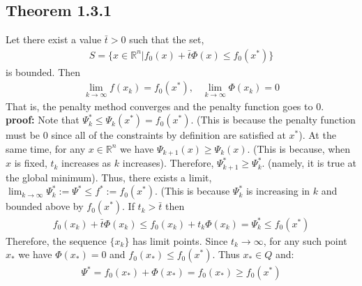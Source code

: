 \documentclass[12pt,a4paper]{article}
\begin{document}
	\subsection*{Theorem 1.3.1}\label{thm131}
	Let there exist a value $\bar{t}>0$ such that the set,
	\begin{align*}
		S = \{x \in \mathbb{R}^n | f_0(x) + \bar{t}\Phi(x) \leq f_0(x^*)\}
	\end{align*}
	is bounded. Then
	\begin{align*}
		\lim_{k \rightarrow \infty}f(x_k) = f_0(x^*), \hspace{10pt} \lim_{k \rightarrow \infty}\Phi(x_k) = 0
	\end{align*}
	That is, the penalty method converges and the penalty function goes to $0$.\\
	\textbf{proof:} Note that $\Psi_k^* \leq \Psi_k(x^*) = f_0(x^*)$. (This is because the penalty function must be $0$ since all of the constraints by definition are satisfied at $x^*$). At the same time, for any $x \in \mathbb{R}^n$ we have $\Psi_{k+1}(x)\geq \Psi_k(x)$. (This is because, when $x$ is fixed, $t_k$ increases as $k$ increases). Therefore, $\Psi_{k+1}^* \geq  \Psi_k^*$. (namely, it is true at the global minimum). Thus, there exists a limit, $\lim_{k \rightarrow \infty}\Psi_k^* := \Psi^* \leq f^* := f_0(x^*)$. (This is because $\Psi_k^*$ is increasing in $k$ and bounded above by $f_0(x^*)$. If $t_k > \bar{t}$ then
	\begin{align*}
		f_0(x_k) + \bar{t}\Phi(x_k) \leq f_0(x_k) + t_k\Phi(x_k) = \Psi_k^* \leq f_0(x^*)
	\end{align*}
	Therefore, the sequence $\{x_k\}$ has limit points. Since $t_k \rightarrow \infty$, for any such point $x_*$ we have $\Phi(x_*) = 0$ and $f_0(x_*) \leq f_0(x^*)$. Thus $x_* \in Q$ and:
	\begin{align*}
		\Psi^* = f_0(x_*) + \Phi(x_*) = f_0(x_*) \geq f_0(x^*)
	\end{align*}
\end{document}
